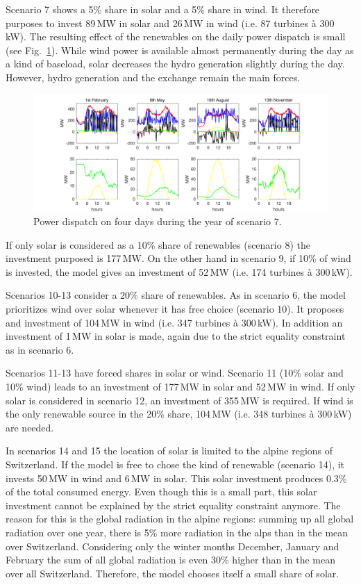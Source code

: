 Scenario 7 shows a 5\% share in solar and a 5\% share in wind. It therefore purposes to invest 89\,MW in solar and 26\,MW in wind (i.e. 87 turbines à 300\,kW). The resulting effect of the renewables on the daily power dispatch is small (see Fig.~\ref{fig:results days scenario 7}). While wind power is available almost permanently during the day as a kind of baseload, solar decreases the hydro generation slightly during the day. However, hydro generation and the exchange remain the main forces.

\begin{figure}
    \centering
    \includegraphics[width=\textwidth]{figures/Results/power_dispatch_days_scenario7.pdf}
    \caption{Power dispatch on four days during the year of scenario 7.}
    \label{fig:results days scenario 7}
\end{figure}

If only solar is considered as a 10\% share of renewables (scenario 8) the investment purposed is 177\,MW. On the other hand in scenario 9, if 10\% of wind is invested, the model gives an investment of 52\,MW (i.e. 174 turbines à 300\,kW).

Scenarios 10-13 consider a 20\% share of renewables. As in scenario 6, the model prioritizes wind over solar whenever it has free choice (scenario 10). It proposes and investment of 104\,MW in wind (i.e. 347 turbines à 300\,kW). In addition an investment of 1\,MW in solar is made, again due to the strict equality constraint as in scenario 6. 

Scenarios 11-13 have forced shares in solar or wind. Scenario 11 (10\% solar and 10\% wind) leads to an investment of 177\,MW in solar and 52\,MW in wind. If only solar is considered in scenario 12, an investment of 355\,MW is required. If wind is the only renewable source in the 20\% share, 104\,MW (i.e. 348 turbines à 300\,kW) are needed. 

In scenarios 14 and 15 the location of solar is limited to the alpine regions of Switzerland. If the model is free to chose the kind of renewable (scenario 14), it invests 50\,MW in wind and 6\,MW in solar. This solar investment produces 0.3\% of the total consumed energy. Even though this is a small part, this solar investment cannot be explained by the strict equality constraint anymore. The reason for this is the global radiation in the alpine regions: summing up all global radiation over one year, there is 5\% more radiation in the alps than in the mean over Switzerland. Considering only the winter months December, January and February the sum of all global radiation is even 30\% higher than in the mean over all Switzerland. Therefore, the model chooses itself a small share of solar. 

